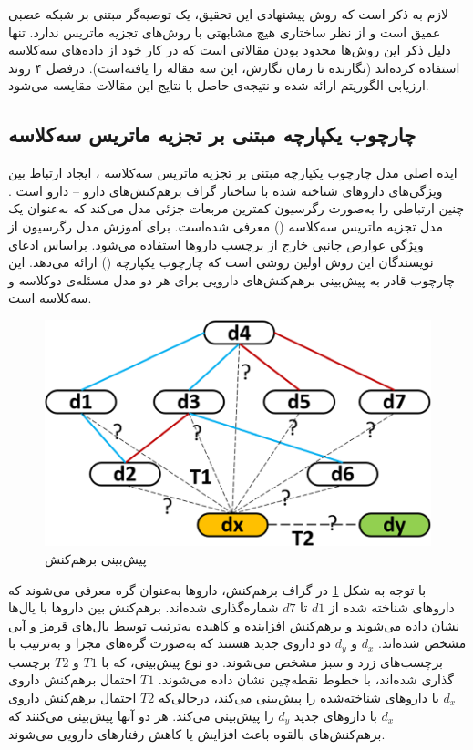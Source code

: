  لازم به ذکر است که روش پیشنهادی این تحقیق، یک توصیه‌گر مبتنی بر شبکه عصبی عمیق است و از نظر ساختاری هیچ مشابهتی با روش‌های تجزیه ماتریس ندارد. تنها دلیل ذکر این روش‌ها محدود بودن مقالاتی است که در کار خود از داده‌های سه‌کلاسه  استفاده کرده‌اند (نگارنده تا زمان نگارش، این سه مقاله را یافته‌است). درفصل ۴ روند ارزیابی الگوریتم ارائه شده و نتیجه‌ی حاصل با نتایج این مقالات مقایسه می‌شود.


\subsection{چارچوب یکپارچه مبتنی بر تجزیه ماتریس سه‌کلاسه}

ایده اصلی مدل چارچوب یکپارچه مبتنی بر تجزیه ماتریس سه‌کلاسه
،
ایجاد ارتباط بین ویژگی‌های داروهای شناخته شده با ساختار گراف برهم‌کنش‌های دارو – دارو است
\cite{Shi J-Y2018}.
چنین ارتباطی را به‌صورت رگرسیون کمترین مربعات جزئی
مدل می‌کند که به‌عنوان یک مدل تجزیه ماتریس سه‌کلاسه
()
معرفی شده‌است. برای آموزش مدل رگرسیون از ویژگی عوارض جانبی خارج از برچسب داروها استفاده می‌شود. براساس ادعای نویسندگان این روش اولین روشی است که چارچوب یکپارچه
()
ارائه می‌دهد. این چارچوب قادر به پیش‌بینی برهم‌کنش‌های دارویی برای هر دو مدل مسئله‌ی دوکلاسه و سه‌کلاسه است.

\begin{figure}[!h]
\centering
\includegraphics[scale=.5]{section2/TMFUFgraf.png}
	\caption{پیش‌بینی برهم‌کنش 
\cite{Shi J-Y2018}}
\label{TMFUFgraf}
\end{figure}

با توجه به شکل
\ref{TMFUFgraf}
در گراف برهم‌کنش‌، داروها به‌عنوان گره‌ معرفی می‌شوند که داروهای شناخته شده از
$d1$
تا
$d7$
شماره‌گذاری شده‌اند. برهم‌کنش بین داروها با یال‌ها نشان داده می‌شوند و برهم‌کنش افزاینده و کاهنده به‌ترتیب توسط یال‌های قرمز و آبی مشخص شده‌اند. 
$d_x$
و
$d_y$
دو داروی جدید هستند که به‌صورت گره‌های مجزا و به‌ترتیب با برچسب‌های زرد و سبز مشخص می‌شوند. دو نوع پیش‌بینی، که با
$T1$
و
$T2$
برچسب گذاری شده‌اند، با خطوط نقطه‌چین نشان داده می‌شوند.
$T1$
احتمال برهم‌کنش داروی 
$d_x$
با داروهای شناخته‌شده را پیش‌بینی می‌کند، درحالی‌که
$T2$
احتمال برهم‌کنش داروی 
$d_x$
با داروهای جدید
$d_y$
را پیش‌بینی می‌کند. هر دو آنها پیش‌بینی می‌کنند که برهم‌کنش‌های بالقوه باعث افزایش یا کاهش رفتارهای دارویی می‌شوند.

